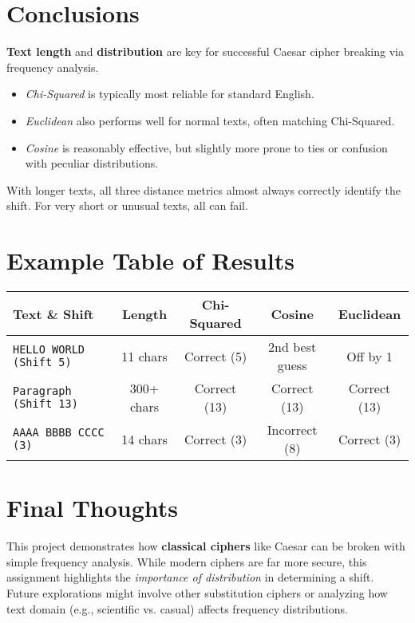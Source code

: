 \documentclass[11pt]{article}
\begin{document}
\section{Conclusions}
\textbf{Text length} and \textbf{distribution} are key for successful Caesar cipher breaking via frequency analysis.
\begin{itemize}
\item \emph{Chi-Squared} is typically most reliable for standard English.
\item \emph{Euclidean} also performs well for normal texts, often matching Chi-Squared.
\item \emph{Cosine} is reasonably effective, but slightly more prone to ties or confusion with peculiar distributions.
\end{itemize}
With longer texts, all three distance metrics almost always correctly identify the shift. For very short or unusual texts, all can fail.

\section{Example Table of Results}
\begin{center}
\begin{tabular}{|l|c|c|c|c|}
\hline
\textbf{Text \& Shift} & \textbf{Length} & \textbf{Chi-Squared} & \textbf{Cosine} & \textbf{Euclidean} \\
\hline
\texttt{HELLO WORLD (Shift 5)} & 11 chars 
  & Correct (5) 
  & 2nd best guess 
  & Off by 1 
  \\
\hline
\texttt{Paragraph (Shift 13)} & 300+ chars 
  & Correct (13) 
  & Correct (13) 
  & Correct (13) 
  \\
\hline
\texttt{AAAA BBBB CCCC (3)} & 14 chars 
  & Correct (3) 
  & Incorrect (8) 
  & Correct (3) 
  \\
\hline
\end{tabular}
\end{center}

\section{Final Thoughts}
This project demonstrates how \textbf{classical ciphers} like Caesar can be broken with simple frequency analysis. 
While modern ciphers are far more secure, this assignment highlights the \emph{importance of distribution} in determining a shift. 
Future explorations might involve other substitution ciphers or analyzing how text domain (e.g., scientific vs. casual) affects frequency distributions.
\end{document}
